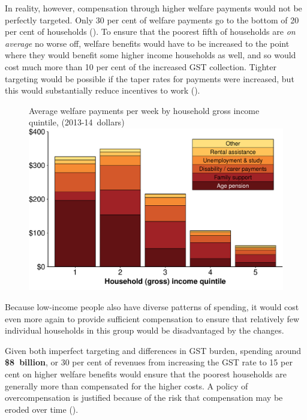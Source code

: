 In reality, however, compensation through higher welfare payments would not be perfectly targeted. Only 30 per cent of welfare payments go to the bottom of 20 per cent of households (). To ensure that the poorest fifth of households are \emph{on average} no worse off, welfare benefits would have to be increased to the point where they would benefit some higher income households as well, and so would cost much more than 10 per cent of the increased GST collection. Tighter targeting would be possible if the taper rates for payments were increased, but this would substantially reduce incentives to work (). 

\begin{figure}[!t]
%
{Average welfare payments per week by household gross income quintile, (2013-14~dollars)}
\includegraphics[width=\columnwidth]{atlas/figure/GST-Figure-6-1.pdf}

\end{figure}

Because low-income people also have diverse patterns of spending, it would cost even more again to provide sufficient compensation to ensure that relatively few individual households in this group would be disadvantaged by the changes. 

Given both imperfect targeting and differences in GST burden, spending around \textbf{\$8~billion}, or 30 per cent of revenues from increasing the GST rate to 15 per cent  on higher welfare benefits would ensure that the poorest households are generally more than compensated for the higher costs. A policy of overcompensation is justified because of the risk that compensation may be eroded over time ().

